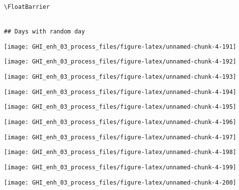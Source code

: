 \documentclass[
  10pt,
  a4paper,oneside]{article}
\begin{document}
\begin{verbatim}
 
 

\FloatBarrier


## Days with random day 
\end{verbatim}

\begin{center}\texttt{[image: GHI\_enh\_03\_process\_files/figure-latex/unnamed-chunk-4-191]} \end{center}

\begin{center}\texttt{[image: GHI\_enh\_03\_process\_files/figure-latex/unnamed-chunk-4-192]} \end{center}

\begin{center}\texttt{[image: GHI\_enh\_03\_process\_files/figure-latex/unnamed-chunk-4-193]} \end{center}

\begin{center}\texttt{[image: GHI\_enh\_03\_process\_files/figure-latex/unnamed-chunk-4-194]} \end{center}

\begin{center}\texttt{[image: GHI\_enh\_03\_process\_files/figure-latex/unnamed-chunk-4-195]} \end{center}

\begin{center}\texttt{[image: GHI\_enh\_03\_process\_files/figure-latex/unnamed-chunk-4-196]} \end{center}

\begin{center}\texttt{[image: GHI\_enh\_03\_process\_files/figure-latex/unnamed-chunk-4-197]} \end{center}

\begin{center}\texttt{[image: GHI\_enh\_03\_process\_files/figure-latex/unnamed-chunk-4-198]} \end{center}

\begin{center}\texttt{[image: GHI\_enh\_03\_process\_files/figure-latex/unnamed-chunk-4-199]} \end{center}

\begin{center}\texttt{[image: GHI\_enh\_03\_process\_files/figure-latex/unnamed-chunk-4-200]} \end{center}
\end{document}
